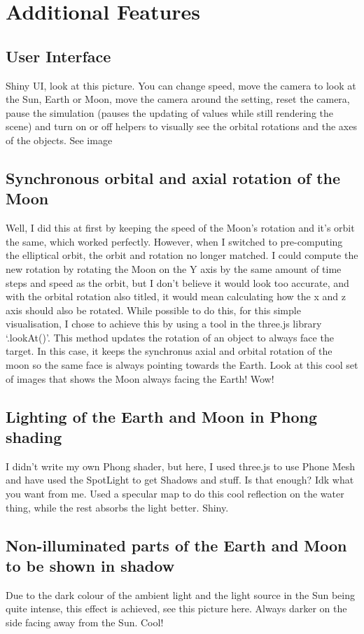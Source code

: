 \documentclass[12pt]{article}
\begin{document}
\section{Additional Features}
\subsection{User Interface}
Shiny UI, look at this picture. You can change speed, move the camera to look at the Sun, Earth or Moon, move the camera around the setting, reset the camera, pause the simulation (pauses the updating of values while still rendering the scene) and turn on or off helpers to visually see the orbital rotations and the axes of the objects. See image

\subsection{Synchronous orbital and axial rotation of the Moon}
Well, I did this at first by keeping the speed of the Moon's rotation and it's orbit the same, which worked perfectly. However, when I switched to pre-computing the elliptical orbit, the orbit and rotation no longer matched. I could compute the new rotation by rotating the Moon on the Y axis by the same amount of time steps and speed as the orbit, but I don't believe it would look too accurate, and with the orbital rotation also titled, it would mean calculating how the x and z axis should also be rotated. While possible to do this, for this simple visualisation, I chose to achieve this by using a tool in the three.js library `.lookAt()'. This method updates the rotation of an object to always face the target. In this case, it keeps the synchronus axial and orbital rotation of the moon so the same face is always pointing towards the Earth. Look at this cool set of images that shows the Moon always facing the Earth! Wow!

\subsection{Lighting of the Earth and Moon in Phong shading}
I didn't write my own Phong shader, but here, I used three.js to use Phone Mesh and have used the SpotLight to get Shadows and stuff. Is that enough? Idk what you want from me. Used a specular map to do this cool reflection on the water thing, while the rest absorbs the light better. Shiny.

\subsection{Non-illuminated parts of the Earth and Moon to be shown in shadow}
Due to the dark colour of the ambient light and the light source in the Sun being quite intense, this effect is achieved, see this picture here. Always darker on the side facing away from the Sun. Cool!
\end{document}
